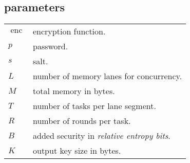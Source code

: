 \documentclass[twocolumn]{article}
\DeclareMathOperator{\enc}{enc}
\begin{document}
\subsection{parameters}
\begin{tabularx}{\columnwidth}{lX}
    $\enc$ & encryption function.\\
    $p$ & password.\\
    $s$ & salt.\\
    $L$ & number of memory lanes for concurrency.\\
    $M$ & total memory in bytes.\\
    $T$ & number of tasks per lane segment.\\
    $R$ & number of rounds per task.\\
    $B$ & added security in \emph{relative entropy bits}.\\
    $K$ & output key size in bytes.\\
\end{tabularx}
\end{document}
